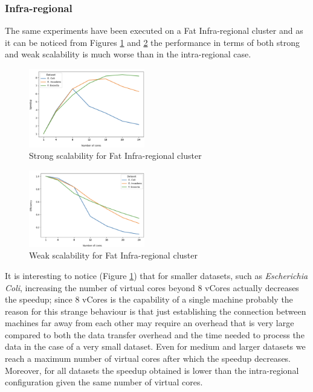 \documentclass[final,5p,times,twocolumn,authoryear]{elsarticle}
\begin{document}
\subsubsection{Infra-regional}
The same experiments have been executed on a Fat Infra-regional cluster and as it can be noticed from Figures \ref{fig:fat-infra-strong} and \ref{fig:fat-infra-weak} the performance in terms of both strong and weak scalability is much worse than in the intra-regional case. \\
\begin{figure}[H]
   \centering
   \includegraphics[width=0.45\textwidth]{images/fat_infra_strong.png}
   \caption{Strong scalability for Fat Infra-regional cluster }
   \label{fig:fat-infra-strong}
\end{figure}
\begin{figure}[H]
   \centering
   \includegraphics[width=0.45\textwidth]{images/fat_infra_weak.png}
   \caption{Weak scalability for Fat Infra-regional cluster }
   \label{fig:fat-infra-weak}
\end{figure}
It is interesting to notice (Figure \ref{fig:fat-infra-strong}) that for smaller datasets, such as \emph{Escherichia Coli}, increasing the number of virtual cores beyond 8 vCores actually decreases the speedup; since 8 vCores is the capability of a single machine probably the reason for this strange behaviour is that just establishing the connection between machines far away from each other may require an overhead that is very large compared to both the data transfer overhead and the time needed to process the data in the case of a very small dataset. Even for medium and larger datasets we reach a maximum number of virtual cores after which the speedup decreases. Moreover, for all datasets the speedup obtained is lower than the intra-regional configuration given the same number of virtual cores. \\ 
\end{document}
